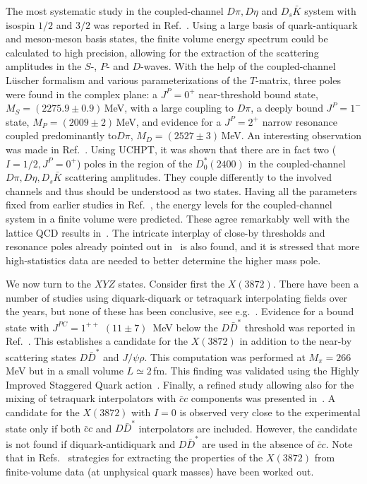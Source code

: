 The most systematic study in the coupled-channel $D\pi, D\eta$ and $D_s\bar K$
system with isospin $1/2$ and $3/2$ was reported in Ref.~\cite{Moir:2016srx}.
Using a large basis of quark-antiquark and meson-meson basis states, the
finite volume energy spectrum could be calculated to high precision, allowing
for the extraction of the scattering amplitudes in the $S$-, $P$- and $D$-waves.
With the help of the coupled-channel L\"uscher formalism and various
parameterizations of the $T$-matrix, three poles were found in the complex 
plane: a 
$J^P=0^+$ near-threshold bound state, $M_S=(2275.9\pm 0.9)\,$MeV,
with a large coupling to $D\pi$,
a deeply bound $J^P=1^-$ state,   $M_P=(2009\pm 2)\,$MeV,
and evidence for a $J^P=2^+$ narrow 
resonance coupled predominantly to$D\pi$,  $M_D=(2527\pm 3)\,$MeV.
An interesting observation was made in Ref.~\cite{Albaladejo:2016lbb}.
Using UCHPT, it was shown that there are in fact two 
($I=1/2, J^P=0^+$) poles  in the region of the $D_0^*(2400)$ in 
the coupled-channel $D\pi, D\eta, 
D_s\bar K$ scattering amplitudes. {They couple differently to the involved
channels and thus should be understood as two states.} Having all the parameters
fixed from earlier studies in Ref.~\cite{Liu:2012zya}, the energy levels for the coupled-channel system in a 
finite volume were predicted. These agree remarkably well with the
lattice QCD results in~\cite{Moir:2016srx}. The intricate interplay of 
close-by thresholds and resonance poles already pointed out 
in~\cite{Doring:2013glu} is also found, and it is stressed that more
high-statistics data are needed to better determine the higher mass pole.

We now turn to the $XYZ$ states. Consider first the $X(3872)$. There
have been a number of studies using diquark-diquark or tetraquark
interpolating fields over the years, but none of these has been 
conclusive, see e.g.~\cite{Chiu:2006hd,Yang:2012mya}. 
Evidence for a bound state with $J^{PC}=1^{++}$
$(11\pm7)$~MeV below the $D\bar D^*$ threshold was reported in 
Ref.~\cite{Prelovsek:2013cra}. 
This establishes a candidate for the  $X(3872)$ in addition to the
near-by scattering states  $D\bar D^*$ and $J/\psi \rho$. This computation
was performed at $M_\pi =266\,$MeV but in a small volume $L\simeq 2\,$fm. 
This finding was validated using the Highly Improved Staggered Quark 
action~\cite{Lee:2014uta}. Finally, a refined study allowing also
for the mixing of tetraquark interpolators with $\bar c c$ components
was presented in~\cite{Padmanath:2015era}.
A candidate for the $X(3872)$ with $I = 0$ is observed very 
close to the  experimental state only if both $\bar cc$ and $D\bar D^*$ 
interpolators are included. However, the candidate is 
not found if diquark-antidiquark and $D\bar D^*$ are used in the 
absence of $\bar c c$. Note that in 
Refs.~\cite{Jansen:2013cba,Garzon:2013uwa,Jansen:2015lha,Baru:2015tfa}
strategies for extracting the properties of the $X(3872)$ from 
finite-volume data (at unphysical quark masses) have been worked out.


